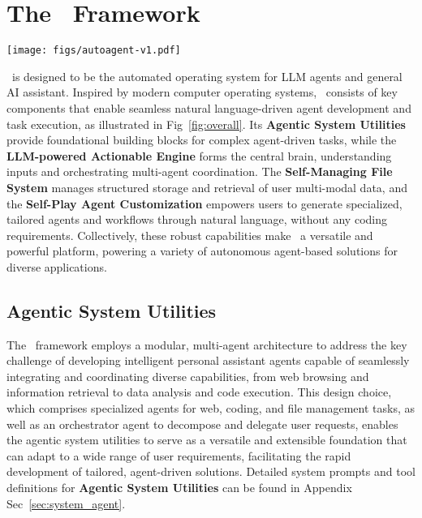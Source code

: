 \section{The \model\ Framework}

\begin{figure*}[t]
\vspace{-1em}
    \begin{center}
    \texttt{[image: figs/autoagent-v1.pdf]}
    \end{center}
    \vspace{-0.5em}
    \caption{\model\ is a fully automated, language-driven generalist agent system. The core components that enable this include the Agentic System Utilities, the LLM-powered Actionable Engine, the Self-Managing File System, and the Self-Play Agent Customization module.}
    \label{fig:overall}
    \vspace{-1.0em}
\end{figure*}

\model\ is designed to be the automated operating system for LLM agents and general AI assistant. Inspired by modern computer operating systems, \model\ consists of key components that enable seamless natural language-driven agent development and task execution, as illustrated in Fig~\ref{fig:overall}. Its \textbf{Agentic System Utilities} provide foundational building blocks for complex agent-driven tasks, while the \textbf{LLM-powered Actionable Engine} forms the central brain, understanding inputs and orchestrating multi-agent coordination. The \textbf{Self-Managing File System} manages structured storage and retrieval of user multi-modal data, and the \textbf{Self-Play Agent Customization} empowers users to generate specialized, tailored agents and workflows through natural language, without any coding requirements. Collectively, these robust capabilities make \model\ a versatile and powerful platform, powering a variety of autonomous agent-based solutions for diverse applications.

\subsection{Agentic System Utilities}
The \model\ framework employs a modular, multi-agent architecture to address the key challenge of developing intelligent personal assistant agents capable of seamlessly integrating and coordinating diverse capabilities, from web browsing and information retrieval to data analysis and code execution. This design choice, which comprises specialized agents for web, coding, and file management tasks, as well as an orchestrator agent to decompose and delegate user requests, enables the agentic system utilities to serve as a versatile and extensible foundation that can adapt to a wide range of user requirements, facilitating the rapid development of tailored, agent-driven solutions. Detailed system prompts and tool definitions for \textbf{Agentic System Utilities} can be found in Appendix Sec~\ref{sec:system_agent}.

